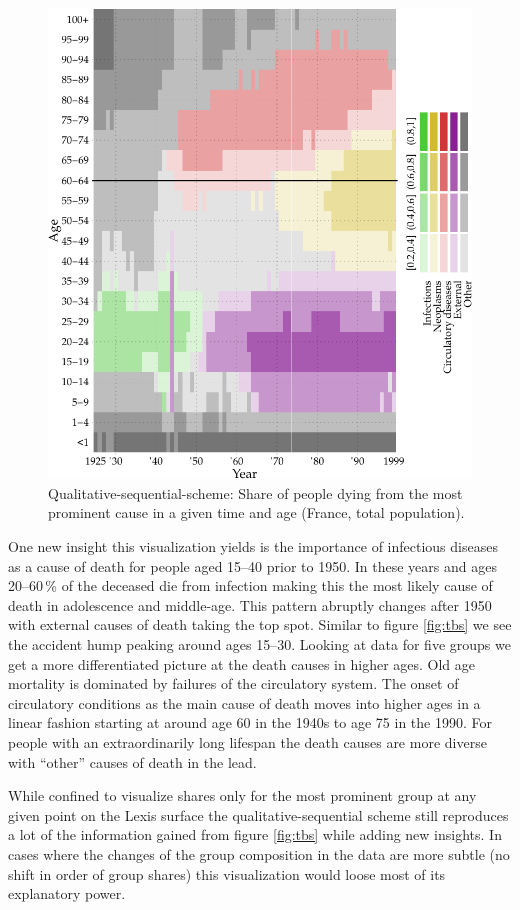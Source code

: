 \documentclass[a4paper]{scrartcl}
\begin{document}
\begin{figure}[htb!]
  \centering
  \includegraphics[width = 0.8\linewidth]{../fig/plot-qual_seq.pdf}
  \caption{Qualitative-sequential-scheme: Share of people dying from the most prominent cause in a given time and age (France, total population).}
  \label{fig:qss}
\end{figure}

One new insight this visualization yields is the importance of infectious diseases as a cause of death for people aged 15--40 prior to 1950. In these years and ages 20--60\,\% of the deceased die from infection making this the most likely cause of death in adolescence and middle-age. This pattern abruptly changes after 1950 with external causes of death taking the top spot. Similar to figure \ref{fig:tbs} we see the accident hump peaking around ages 15--30. Looking at data for five groups we get a more differentiated picture at the death causes in higher ages. Old age mortality is dominated by failures of the circulatory system. The onset of circulatory conditions as the main cause of death moves into higher ages in a linear fashion starting at around age 60 in the 1940s to age 75 in the 1990. For people with an extraordinarily long lifespan the death causes are more diverse with \enquote{other} causes of death in the lead.

While confined to visualize shares only for the most prominent group at any given point on the Lexis surface the qualitative-sequential scheme still reproduces a lot of the information gained from figure \ref{fig:tbs} while adding new insights. In cases where the changes of the group composition in the data are more subtle (no shift in order of group shares) this visualization would loose most of its explanatory power.
\end{document}
